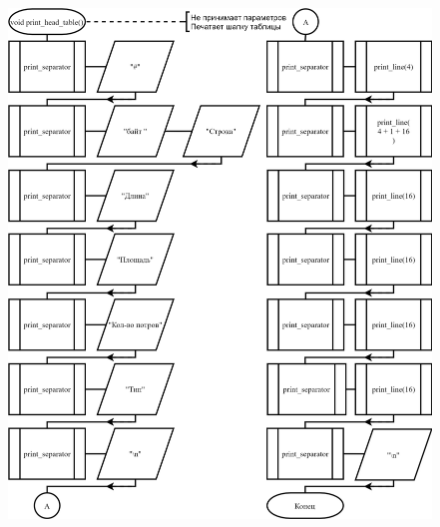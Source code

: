 \begin{figure}[!htp]
    \includegraphics{../../Makefile-project/src/menu/view_all_elements/view_all_elements-3.png}
\end{figure}

